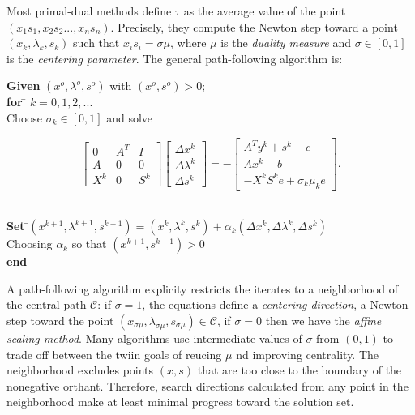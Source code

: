 \documentclass[a4paper,10 pt,titlepage,twoside]{book}
\theoremstyle{plain}
\theoremstyle{definition}
\theoremstyle{remark}
\begin{document}
Most primal-dual methods define $\tau$ as the average value of the point $(x_{1}s_{1},x_{2}s_{2}...,x_{n}s_{n})$. Precisely, they compute the Newton step toward a point $(x_{k}, \lambda_{k},s_{k})$ such that $x_{i}s_{i}=\sigma\mu$, where $\mu$ is the \textit{duality measure} and $\sigma\in[0,1]$ is the \textit{centering parameter}. The general path-following algorithm is:
\begin{tabbing}
\textbf{Given} $(x^{o}, \lambda^{o}, s^{o})$ with $(x^{o}, s^{o})>0$;\\
\textbf{for} \= $k = 0, 1, 2,...$ \\
\> Choose $\sigma_{k}\in[0,1]$ and solve
\end{tabbing}
\begin{equation}\label{(5.8)}
	\begin{bmatrix}
	0&A^{T}&I \\A&0&0\\X^{k}&0&S^{k}
	\end{bmatrix}\begin{bmatrix}
	\Delta x^{k}\\\Delta\lambda^{k} \\\Delta s^{k}
	\end{bmatrix}=-\begin{bmatrix}
	A^{T}y^{k}+s^{k}-c\\Ax^{k}-b\\-X^{k}S^{k}e + \sigma_{k}\mu_{k}e
	\end{bmatrix}.
\end{equation}
\begin{tabbing}
	\\
	\textbf{Set} \=$(x^{k+1}, \lambda^{k+1}, s^{k+1}) = (x^{k}, \lambda^{k}, s^{k})+ \alpha_{k}(\Delta x^{k}, \Delta\lambda^{k}, \Delta s^{k})$\\
	\> Choosing $\alpha_{k}$ so that $(x^{k+1}, s^{k+1})>0$ \\
	\textbf{end}
\end{tabbing}
A path-following algorithm explicity restricts the iterates to a neighborhood of the central path $\mathcal{C}$: if $\sigma = 1$, the equations define a \textit{centering direction}, a Newton step toward the point $(x_{\sigma\mu},\lambda_{\sigma\mu}, s_{\sigma\mu})\in\mathcal{C}$, if $\sigma = 0$ then we have the \textit{affine scaling method}. Many algorithms use intermediate values of $\sigma$ from $(0,1)$ to trade off between the twiin goals of reucing $\mu$ nd improving centrality. The neighborhood excludes points $(x, s) $ that are too close to the boundary of the nonegative orthant. Therefore, search directions calculated from any point in the neighborhood make at least minimal progress toward the solution set.
\end{document}
